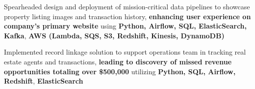 \begin{cventries}
{\begin{cvitems}
         \item{Spearheaded design and deployment of mission-critical data pipelines to showcase property listing images and transaction history, \textbf{enhancing user experience on company's primary website} using \textbf{Python, Airflow, SQL, ElasticSearch, Kafka}, \textbf{AWS (Lambda, SQS, S3, Redshift, Kinesis, DynamoDB)}}
         \item{Implemented record linkage solution to support operations team in tracking real estate agents and transactions, \textbf{leading to discovery of missed revenue opportunities totaling over \$500,000} utilizing \textbf{Python, SQL, Airflow, Redshift}, \textbf{ElasticSearch}}

\end{cvitems}}
\end{cventries}
